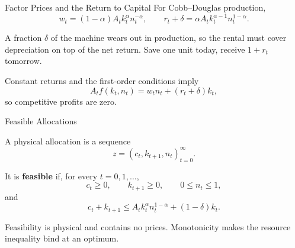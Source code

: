 \documentclass[11pt,aspectratio=169,c]{beamer}
\begin{document}
\begin{frame}{Factor Prices and the Return to Capital}
  For Cobb--Douglas production,
  \[
    w_t=(1-\alpha)A_t k_t^\alpha n_t^{-\alpha},
    \qquad
    r_t+\delta=\alpha A_t k_t^{\alpha-1}n_t^{1-\alpha}.
  \]

  A fraction $\delta$ of the machine wears out in production, so the rental must cover
  depreciation on top of the net return. Save one unit today, receive $1+r_t$
  tomorrow.

  Constant returns and the first-order conditions imply
  \[
    A_t f(k_t,n_t)=w_tn_t+(r_t+\delta)k_t,
  \]
  so competitive profits are zero.
\end{frame}

\begin{frame}{Feasible Allocations}
  \begin{definitionbox}
    A physical allocation is a sequence
    \[
      z=\left(c_t,k_{t+1},n_t\right)_{t=0}^{\infty}.
    \]
  \end{definitionbox}

  It is \textbf{feasible} if, for every $t=0,1,\ldots$,
  \[
    c_t\geq0,
    \qquad
    k_{t+1}\geq0,
    \qquad
    0\leq n_t\leq1,
  \]
  and
  \[
    \boxed{
      c_t+k_{t+1}
      \leq
      A_t k_t^\alpha n_t^{1-\alpha}+(1-\delta)k_t.
    }
  \]

  Feasibility is physical and contains no prices. Monotonicity makes the
  resource inequality bind at an optimum.
\end{frame}
\end{document}
